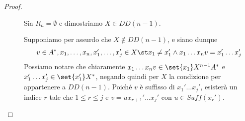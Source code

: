 \begin{proof}
  \begin{description}
    \item[\q{\(\impliedby\)}] 
      Sia \(R_n = \emptyset\) e dimostriamo \(X \in DD(n-1)\).

      Supponiamo per assurdo che \(X \not\in DD(n-1)\), e siano dunque
      \[v \in A^*, x_1,\ldots,x_n,x_1',\ldots,x_j' \in X \st x_1\neq x_1' \land x_1\ldots x_n v = x_1'\ldots x_j'\]
      Possiamo notare che chiaramente \(x_1\ldots x_n v \in \set{x_1}X^{n-1}A^*\) e \(x_1'\ldots x_j' \in \set{x_1'}X^* \), negando quindi per $X$ la condizione per appartenere a \(DD(n-1)\).
      Poiché \(v\) è suffisso di \(x_1'\ldots x_j'\), esisterà un indice \(r\) tale che \(1 \leq r \leq j\) e \(v = u x_{r+1}'\ldots x_j'\) con \(u \in Suff(x_r')\).


\end{description}
\end{proof}
